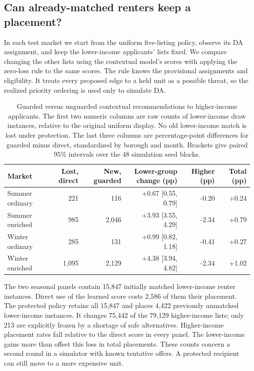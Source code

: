\subsection{Can already-matched renters keep a placement?}
In each test market we start from the uniform five-listing policy, observe
its DA assignment, and keep the lower-income applicants' lists fixed.
We compare changing the other lists using the contextual model's scores
with applying the zero-loss rule to the same scores. The rule knows the
provisional assignments and eligibility. It treats every proposed edge to
a held unit as a possible threat, so the realized priority ordering is used
only to simulate DA.

\begin{table}[t]
\centering\small
\begin{tabular}{@{}lrrrrr@{}}\toprule
Market & Lost, direct & New, guarded & Lower-group change (pp) & Higher (pp) & Total (pp)\\\midrule
Summer ordinary & 221 & 116 & +0.67 [0.55, 0.79] & -0.20 & +0.24 \\
Summer enriched & 985 & 2,046 & +3.93 [3.55, 4.29] & -2.34 & +0.79 \\
Winter ordinary & 285 & 131 & +0.99 [0.82, 1.18] & -0.41 & +0.27 \\
Winter enriched & 1,095 & 2,129 & +4.38 [3.94, 4.82] & -2.34 & +1.02 \\
\bottomrule\end{tabular}
\caption{Guarded versus unguarded contextual recommendations to higher-income
applicants. The first two numeric columns are raw counts of lower-income draw
instances, relative to the original uniform display. No old lower-income match
is lost under protection. The last three columns are percentage-point
differences for guarded minus direct, standardized by borough and month.
Brackets give paired 95\% intervals over the 48 simulation seed blocks.}
\label{tab:guard-evidence}
\end{table}

The two seasonal panels contain 15,847 initially matched lower-income renter
instances. Direct use of the learned score costs 2,586 of them their placement.
The protected policy retains all 15,847 and places 4,422 previously unmatched
lower-income instances. It changes 75,442 of the 79,129 higher-income lists;
only 213 are explicitly frozen by a shortage of safe alternatives.
Higher-income placement rates fall relative to the direct score in every
panel. The lower-income gains more than offset this loss in total placements.
These counts concern a second round in a simulator with known tentative offers.
A protected recipient can still move to a more expensive unit.

